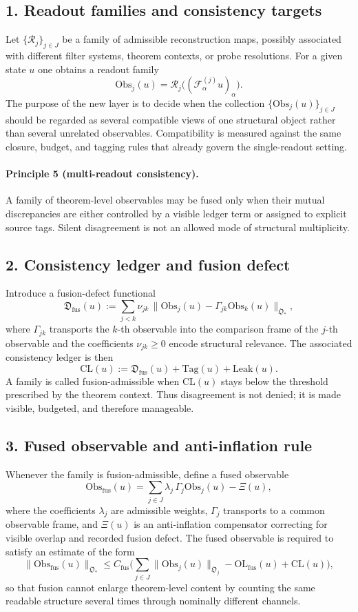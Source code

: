 \documentclass[12pt,a4paper]{article}
\begin{document}
\subsection*{1. Readout families and consistency targets}
Let $\{\mathcal R_j\}_{j\in J}$ be a family of admissible reconstruction maps,
possibly associated with different filter systems, theorem contexts, or probe
resolutions. For a given state $u$ one obtains a readout family
\[
\mathrm{Obs}_j(u)=\mathcal R_j\bigl((\mathcal F^{(j)}_\alpha u)_\alpha\bigr).
\]
The purpose of the new layer is to decide when the collection
$\{\mathrm{Obs}_j(u)\}_{j\in J}$ should be regarded as several compatible views of one
structural object rather than several unrelated observables. Compatibility is
measured against the same closure, budget, and tagging rules that already govern
the single-readout setting.

\paragraph{Principle 5 (multi-readout consistency).}
A family of theorem-level observables may be fused only when their mutual
discrepancies are either controlled by a visible ledger term or assigned to
explicit source tags. Silent disagreement is not an allowed mode of structural
multiplicity.

\subsection*{2. Consistency ledger and fusion defect}
Introduce a fusion-defect functional
\[
\mathfrak D_{\mathrm{fus}}(u)
:= \sum_{j<k}\nu_{jk}\,\|\mathrm{Obs}_j(u)-\Gamma_{jk}\mathrm{Obs}_k(u)\|_{\mathfrak O_*},
\]
where $\Gamma_{jk}$ transports the $k$-th observable into the comparison frame of the
$j$-th observable and the coefficients $\nu_{jk}\ge 0$ encode structural relevance.
The associated consistency ledger is then
\[
\mathrm{CL}(u):=\mathfrak D_{\mathrm{fus}}(u)+\mathrm{Tag}(u)+\mathrm{Leak}(u).
\]
A family is called fusion-admissible when $\mathrm{CL}(u)$ stays below the threshold
prescribed by the theorem context. Thus disagreement is not denied; it is made
visible, budgeted, and therefore manageable.

\subsection*{3. Fused observable and anti-inflation rule}
Whenever the family is fusion-admissible, define a fused observable
\[
\mathrm{Obs}_{\mathrm{fus}}(u)=\sum_{j\in J}\lambda_j\,\Gamma_j\mathrm{Obs}_j(u)-\Xi(u),
\]
where the coefficients $\lambda_j$ are admissible weights, $\Gamma_j$ transports to a
common observable frame, and $\Xi(u)$ is an anti-inflation compensator correcting
for visible overlap and recorded fusion defect. The fused observable is required
to satisfy an estimate of the form
\[
\|\mathrm{Obs}_{\mathrm{fus}}(u)\|_{\mathfrak O_*}
\le C_{\mathrm{fus}}
\bigl(
\sum_{j\in J}\|\mathrm{Obs}_j(u)\|_{\mathfrak O_j}
-\mathrm{OL}_{\mathrm{fus}}(u)
+\mathrm{CL}(u)
\bigr),
\]
so that fusion cannot enlarge theorem-level content by counting the same readable
structure several times through nominally different channels.
\end{document}

